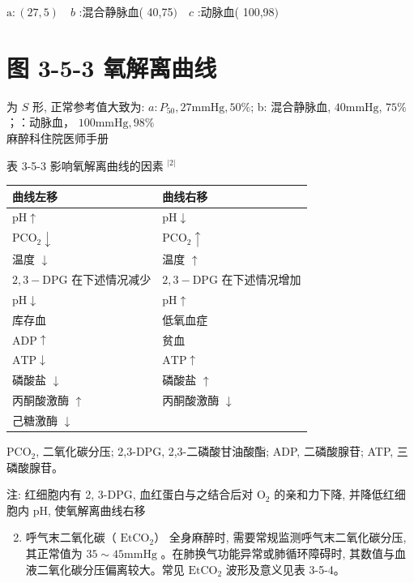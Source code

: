 \documentclass[10pt]{article}
\begin{document}
$\mathrm{a}:(27,5) \quad b$ :混合静脉血( 40,75$) \quad c$ :动脉血( 100,98$)$

\section*{图 3-5-3 氧解离曲线}
为 $S$ 形, 正常参考值大致为: $a: P_{50}, 27 \mathrm{mmHg}, 50 \%$; b: 混合静脉血, $40 \mathrm{mmHg}$, $75 \%$ ；：动脉血， $100 \mathrm{mmHg}, 98 \%$\\
麻醉科住院医师手册

表 3-5-3 影响氧解离曲线的因素 ${ }^{|2|}$

\begin{center}
\begin{tabular}{ll}
\hline
曲线左移 & 曲线右移 \\
\hline
$\mathrm{pH} \uparrow$ & $\mathrm{pH} \downarrow$ \\
$\mathrm{PCO}_{2} \downarrow$ & $\mathrm{PCO}_{2} \uparrow$ \\
温度 $\downarrow$ & 温度 $\uparrow$ \\
$2,3-\mathrm{DPG}$ 在下述情况减少 & $2,3-\mathrm{DPG}$ 在下述情况增加 \\
$\mathrm{pH} \downarrow$ & $\mathrm{pH} \uparrow$ \\
库存血 & 低氧血症 \\
$\mathrm{ADP} \uparrow$ & 贫血 \\
$\mathrm{ATP} \downarrow$ & $\mathrm{ATP} \uparrow$ \\
磷酸盐 $\downarrow$ & 磷酸盐 $\uparrow$ \\
丙酮酸激酶 $\uparrow$ & 丙酮酸激酶 $\downarrow$ \\
己糖激酶 $\downarrow$ &  \\
\hline
\end{tabular}
\end{center}

$\mathrm{PCO}_{2}$, 二氧化碳分压; 2,3-DPG, 2,3-二磷酸甘油酸酯; ADP, 二磷酸腺苷; ATP, 三磷酸腺苷。

注: 红细胞内有 2, 3-DPG, 血红蛋白与之结合后对 $\mathrm{O}_{2}$ 的亲和力下降, 并降低红细胞内 $\mathrm{pH}$, 使氧解离曲线右移

\begin{enumerate}
  \setcounter{enumi}{1}
  \item 呼气末二氧化碳（ $\mathrm{EtCO}_{2} ）$ 全身麻醉时, 需要常规监测呼气末二氧化碳分压, 其正常值为 $35 \sim 45 \mathrm{mmHg}$ 。在肺换气功能异常或肺循环障碍时, 其数值与血液二氧化碳分压偏离较大。常见 $\mathrm{EtCO}_{2}$ 波形及意义见表 3-5-4。
\end{enumerate}
\end{document}
